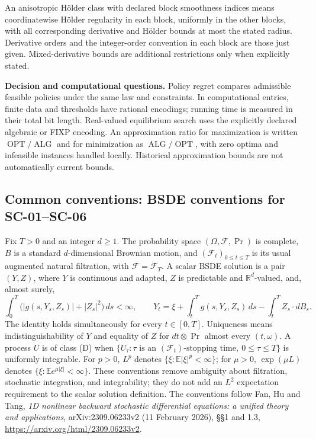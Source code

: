 \documentclass[11pt,a4paper]{article}
\newcommand{\R}{\mathbb R}
\newcommand{\E}{\mathbb E}
\begin{document}
An anisotropic H\"older class with declared block smoothness indices means
coordinatewise H\"older regularity in each block, uniformly in the other
blocks, with all corresponding derivative and H\"older bounds at most
the stated radius. Derivative orders and the integer-order convention in
each block are those just given. Mixed-derivative bounds are additional
restrictions only when explicitly stated.

\textbf{Decision and computational questions.}
Policy regret compares admissible feasible policies under the same law and
constraints. In computational entries, finite data and thresholds have
rational encodings; running time is measured in their total bit length.
Real-valued equilibrium search uses the explicitly declared algebraic or
FIXP encoding. An approximation ratio for maximization is written
$\operatorname{OPT}/\operatorname{ALG}$ and for minimization as
$\operatorname{ALG}/\operatorname{OPT}$, with zero optima and infeasible
instances handled locally. Historical approximation bounds are not
automatically current bounds.

\subsection*{Common conventions: BSDE conventions for SC-01--SC-06}

Fix $T>0$ and an integer $d\geq1$. The probability space
$(\Omega,\mathcal F,\Pr)$ is complete, $B$ is a standard $d$-dimensional
Brownian motion, and $(\mathcal F_t)_{0\leq t\leq T}$ is its usual augmented
natural filtration, with $\mathcal F=\mathcal F_T$. A scalar BSDE solution
is a pair $(Y,Z)$, where $Y$ is continuous and adapted, $Z$ is predictable
and $\R^d$-valued, and, almost surely,
\[
 \int_0^T\bigl(|g(s,Y_s,Z_s)|+|Z_s|^2\bigr)\,ds<\infty,
 \qquad
 Y_t=\xi+\int_t^T g(s,Y_s,Z_s)\,ds-\int_t^T Z_s\cdot dB_s.
\]
The identity holds simultaneously for every $t\in[0,T]$. Uniqueness means
indistinguishability of $Y$ and equality of $Z$ for $dt\otimes\Pr$ almost
every $(t,\omega)$. A process $U$ is of class (D) when
$\{U_\tau:\tau\text{ is an }(\mathcal F_t)\text{-stopping time},\ 0\leq\tau\leq T\}$
is uniformly integrable. For $p>0$, $L^p$ denotes
$\{\xi:\E|\xi|^p<\infty\}$; for $\mu>0$,
$\exp(\mu L)$ denotes $\{\xi:\E e^{\mu|\xi|}<\infty\}$.
These conventions remove ambiguity about filtration, stochastic integration,
and integrability; they do not add an $L^2$ expectation requirement to the
scalar solution definition. The conventions follow Fan, Hu and Tang,
\emph{1D nonlinear backward stochastic differential equations: a unified
theory and applications}, arXiv:2309.06233v2 (11 February 2026),
\S\S1 and 1.3, \url{https://arxiv.org/html/2309.06233v2}.
\end{document}
